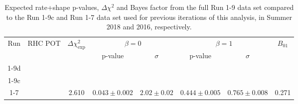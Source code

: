 \begin{table}
	\centering
	\begin{tabular}{|c|c|c|c|c|c|c|c|}
		\hline
		\multirow{2}{*}{Run} & \multirow{2}{*}{RHC POT} & \multirow{2}{*}{$\Delta \chi^2_{\textrm{exp}}$} & \multicolumn{2}{|c|}{$\beta=0$} & \multicolumn{2}{|c|}{$\beta=1$} & \multirow{2}{*}{$B_{01}$}\\
		\cline{4-7}      				
		                     &   				 	    &                                                 & p-value         & $\sigma$      & p-value         & $\sigma$      &   \\
		\hline
		
		
		1-9d                 & \TotalPotNuBarRunOneNine & \DeltachisqAsimovARunOneNineD                   & \pvalRateShapeBetaZeroAsimovARunOneNineD & \sigmaRateShapeBetaZeroAsimovARunOneNineD & \pvalRateShapeBetaOneAsimovARunOneNineD & \sigmaRateShapeBetaOneAsimovARunOneNineD & \BayesFactorAsimovARunOneNineD \\
		\hline
		
		
		1-9c                 & \TotalPotNuBarRunOneNineC& \DeltachisqAsimovA                              & \pvalRateShapeBetaZeroAsimovA & \sigmaRateShapeBetaZeroAsimovA & \pvalRateShapeBetaOneAsimovA & \sigmaRateShapeBetaOneAsimovA & \BayesFactorAsimovA \\
		\hline
		
		
		1-7                  &\TotalPotNuBarRunOneSevenC& 2.610			                                  & $0.043 \pm 0.002$ & $2.02 \pm 0.02$	  &  $0.444 \pm 0.005$ & $0.765 \pm 0.008$		  & 0.271 \\
		\hline
	\end{tabular}
	\caption{Expected rate+shape p-values, $\Delta \chi^2$ and Bayes factor from the full Run 1-9 data set compared to the Run 1-9c and Run 1-7 data set used for previous iterations of this analysis, in Summer 2018 and 2016\cite{OurRun16AntiNueBarAppearanceAnalysis3Flavour}, respectively.}
	\label{tab:sensitivity_comparison_shape_R19d_R17}
\end{table}